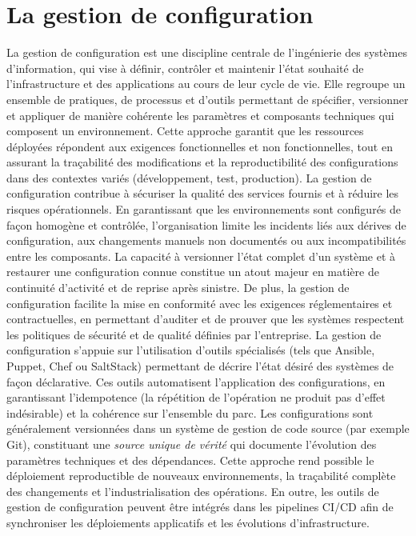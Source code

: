 \section{La gestion de configuration}

La gestion de configuration est une discipline centrale de l’ingénierie des systèmes d’information, qui vise à définir, contrôler et maintenir l’état souhaité de l’infrastructure et des applications au cours de leur cycle de vie. Elle regroupe un ensemble de pratiques, de processus et d’outils permettant de spécifier, versionner et appliquer de manière cohérente les paramètres et composants techniques qui composent un environnement. Cette approche garantit que les ressources déployées répondent aux exigences fonctionnelles et non fonctionnelles, tout en assurant la traçabilité des modifications et la reproductibilité des configurations dans des contextes variés (développement, test, production).
La gestion de configuration contribue à sécuriser la qualité des services fournis et à réduire les risques opérationnels. En garantissant que les environnements sont configurés de façon homogène et contrôlée, l’organisation limite les incidents liés aux dérives de configuration, aux changements manuels non documentés ou aux incompatibilités entre les composants. La capacité à versionner l’état complet d’un système et à restaurer une configuration connue constitue un atout majeur en matière de continuité d’activité et de reprise après sinistre. De plus, la gestion de configuration facilite la mise en conformité avec les exigences réglementaires et contractuelles, en permettant d’auditer et de prouver que les systèmes respectent les politiques de sécurité et de qualité définies par l’entreprise.
La gestion de configuration s’appuie sur l’utilisation d’outils spécialisés (tels que Ansible, Puppet, Chef ou SaltStack) permettant de décrire l’état désiré des systèmes de façon déclarative. Ces outils automatisent l’application des configurations, en garantissant l’idempotence (la répétition de l’opération ne produit pas d’effet indésirable) et la cohérence sur l’ensemble du parc. Les configurations sont généralement versionnées dans un système de gestion de code source (par exemple Git), constituant une \textit{source unique de vérité} qui documente l’évolution des paramètres techniques et des dépendances. Cette approche rend possible le déploiement reproductible de nouveaux environnements, la traçabilité complète des changements et l’industrialisation des opérations. En outre, les outils de gestion de configuration peuvent être intégrés dans les pipelines CI/CD afin de synchroniser les déploiements applicatifs et les évolutions d’infrastructure.

